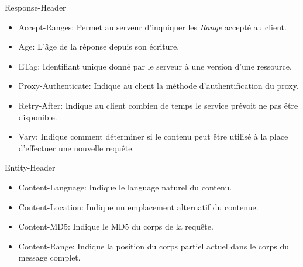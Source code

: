 \documentclass{scrreprt}
\begin{document}
    Response-Header\\
        \begin{itemize}
        \item Accept-Ranges: Permet au serveur d'inquiquer les \textit{Range} accepté au client.
        \item Age: L'âge de la réponse depuis son écriture.
        \item ETag: Identifiant unique donné par le serveur à une version d'une ressource.
        \item Proxy-Authenticate: Indique au client la méthode d'authentification du proxy.
        \item Retry-After: Indique au client combien de temps le service prévoit ne pas être disponible.
        \item Vary: Indique comment déterminer si le contenu peut être utilisé à la place d'effectuer une nouvelle requête.
        \end{itemize}
    Entity-Header\\
        \begin{itemize}                 
        \item Content-Language: Indique le language naturel du contenu.
        \item Content-Location: Indique un emplacement alternatif du contenue.
        \item Content-MD5: Indique le MD5 du corps de la requête.
        \item Content-Range: Indique la position du corps partiel actuel dans le corps du message complet.
        \end{itemize}
 
\end{document}
